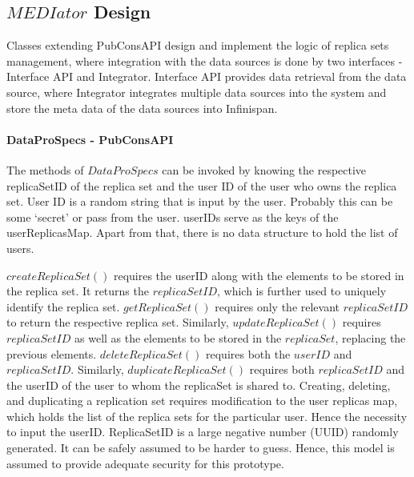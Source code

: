 \documentclass[conference]{IEEEtran}
\begin{document}
\subsection{$MEDIator$ Design}
Classes extending PubConsAPI design and implement the logic of replica sets management, where integration with the data sources is done by two interfaces - Interface API and Integrator. Interface API provides data retrieval from the data source, where Integrator integrates multiple data sources into the system and store the meta data of the data sources into Infinispan.

\paragraph*{DataProSpecs - PubConsAPI}
The methods of $DataProSpecs$ can be invoked by knowing the respective replicaSetID of the replica set and the user ID of the user who owns the replica set. User ID is a random string that is input by the user. Probably this can be some `secret' or pass from the user. userIDs serve as the keys of the userReplicasMap. Apart from that, there is no data structure to hold the list of users.

$createReplicaSet()$ requires the userID along with the elements to be stored in the replica set. It returns the $replicaSetID$, which is further used to uniquely identify the replica set. $getReplicaSet()$ requires only the relevant $replicaSetID$ to return the respective replica set. Similarly, $updateReplicaSet()$ requires $replicaSetID$ as well as the elements to be stored in the $replicaSet$, replacing the previous elements. $deleteReplicaSet()$ requires both the $userID$ and $replicaSetID$. Similarly, $duplicateReplicaSet()$ requires both $replicaSetID$ and the userID of the user to whom the replicaSet is shared to. Creating, deleting, and duplicating a replication set requires modification to the user replicas map, which holds the list of the replica sets for the particular user. Hence the necessity to input the userID. ReplicaSetID is a large negative number (UUID) randomly generated. It can be safely assumed to be harder to guess. Hence, this model is assumed to provide adequate security for this prototype.
\end{document}
